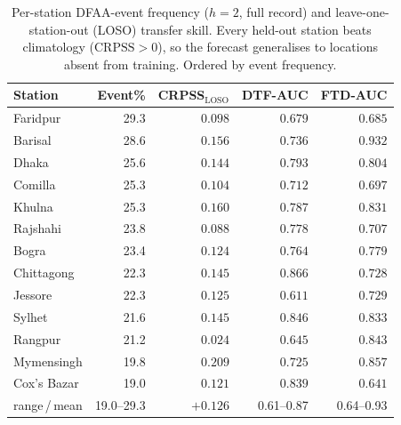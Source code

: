 \documentclass[conference]{IEEEtran}
\begin{document}
\begin{table}[t]
\centering
\caption{Per-station DFAA-event frequency ($h{=}2$, full record) and leave-one-station-out (LOSO)
transfer skill. Every held-out station beats climatology ($\mathrm{CRPSS}>0$), so the forecast
generalises to locations absent from training. Ordered by event frequency.}
\label{tab:spatial}
\footnotesize
\begin{tabular}{lrrrr}
\toprule
Station & Event\% & CRPSS$_{\mathrm{LOSO}}$ & DTF-AUC & FTD-AUC\\
\midrule
Faridpur     & 29.3 & $0.098$ & $0.679$ & $0.685$\\
Barisal      & 28.6 & $0.156$ & $0.736$ & $0.932$\\
Dhaka        & 25.6 & $0.144$ & $0.793$ & $0.804$\\
Comilla      & 25.3 & $0.104$ & $0.712$ & $0.697$\\
Khulna       & 25.3 & $0.160$ & $0.787$ & $0.831$\\
Rajshahi     & 23.8 & $0.088$ & $0.778$ & $0.707$\\
Bogra        & 23.4 & $0.124$ & $0.764$ & $0.779$\\
Chittagong   & 22.3 & $0.145$ & $0.866$ & $0.728$\\
Jessore      & 22.3 & $0.125$ & $0.611$ & $0.729$\\
Sylhet       & 21.6 & $0.145$ & $0.846$ & $0.833$\\
Rangpur      & 21.2 & $0.024$ & $0.645$ & $0.843$\\
Mymensingh   & 19.8 & $0.209$ & $0.725$ & $0.857$\\
Cox's Bazar  & 19.0 & $0.121$ & $0.839$ & $0.641$\\
\midrule
range\,/\,mean & 19.0--29.3 & $\mathbf{+0.126}$ & 0.61--0.87 & 0.64--0.93\\
\bottomrule
\end{tabular}
\end{table}
\end{document}

